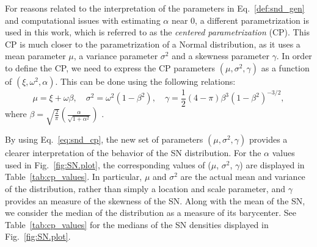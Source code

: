 \documentclass{aa}
\begin{document}
%
For reasons related to the interpretation of the parameters in Eq.~\ref{def:snd_gen} and computational issues with estimating $\alpha$ near 0, a different parametrization is used in this work, which is referred to as the \emph{centered parametrization} (CP).  This CP is much closer to the parametrization of a Normal distribution, as it uses a mean parameter $\mu$, a variance parameter $\sigma^2$ and a skewness parameter $\gamma$. In order to define the CP, we need to express the CP parameters $(\mu, \sigma^2, \gamma)$ as a function of $(\xi, \omega^2, \alpha)$. This can be done using the following relations:
%
\begin{equation} \label{eq:snd_cp}
\mu = \xi + \omega \beta, \quad \sigma^{2} = \omega^{2}(1-\beta^2), \quad \gamma = \frac{1}{2}(4-\pi) \beta^{3}\left(1-\beta^2\right)^{-3/2},
\end{equation}
%
where $\beta = \sqrt{\frac{2}{\pi}}\left(\frac{\alpha}{\sqrt{1+\alpha^2}}\right)$ \citep[e.g.][]{Arellano-2010}.

By using Eq.~\ref{eq:snd_cp}, the new set of parameters $(\mu, \sigma^2, \gamma)$ provides a clearer interpretation of the behavior of the SN distribution. For the $\alpha$ values used in Fig.~\ref{fig:SN.plot}, the corresponding values of ($\mu$, $\sigma^2$, $\gamma$) are displayed in Table~\ref{tab:cp_values}.  In particular, $\mu$ and $\sigma^2$ are the actual mean and variance of the distribution, rather than simply a location and scale parameter, and $\gamma$ provides an measure of the skewness of the SN. 
Along with the mean of the SN, we consider the median of the distribution as a measure of its barycenter.  See Table~\ref{tab:cp_values} for the medians of the SN densities displayed in Fig.~\ref{fig:SN.plot}.

%
\end{document}
